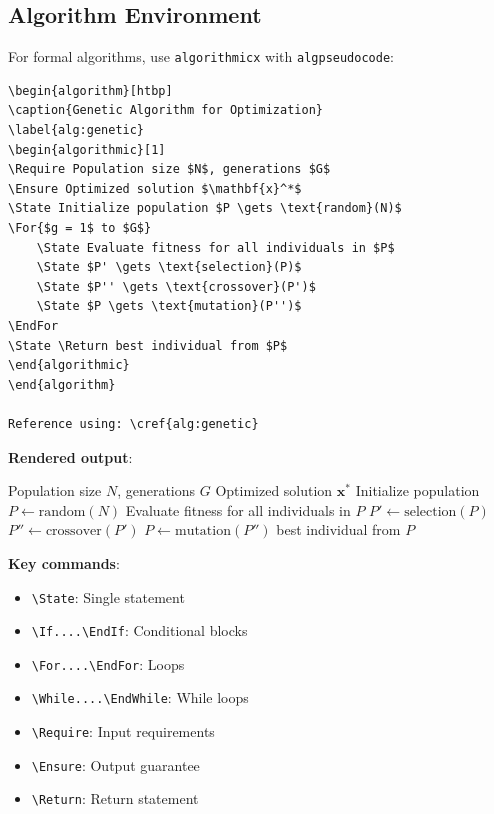 \subsection*{Algorithm Environment}

For formal algorithms, use \texttt{algorithmicx} with \texttt{algpseudocode}:

\begin{verbatim}
\begin{algorithm}[htbp]
\caption{Genetic Algorithm for Optimization}
\label{alg:genetic}
\begin{algorithmic}[1]
\Require Population size $N$, generations $G$
\Ensure Optimized solution $\mathbf{x}^*$
\State Initialize population $P \gets \text{random}(N)$
\For{$g = 1$ to $G$}
    \State Evaluate fitness for all individuals in $P$
    \State $P' \gets \text{selection}(P)$
    \State $P'' \gets \text{crossover}(P')$
    \State $P \gets \text{mutation}(P'')$
\EndFor
\State \Return best individual from $P$
\end{algorithmic}
\end{algorithm}

Reference using: \cref{alg:genetic}
\end{verbatim}

\textbf{Rendered output}:

\begin{algorithm}[htbp]
    \caption{Genetic Algorithm for Optimization}
    \label{alg:genetic_rendered}
    \begin{algorithmic}[1]
        \Require Population size $N$, generations $G$
        \Ensure Optimized solution $\mathbf{x}^*$
        \State Initialize population $P \gets \text{random}(N)$
        \State Evaluate fitness for all individuals in $P$
        \State $P' \gets \text{selection}(P)$
        \State $P'' \gets \text{crossover}(P')$
        \State $P \gets \text{mutation}(P'')$
        \EndFor
        \State \Return best individual from $P$
    \end{algorithmic}
\end{algorithm}

\textbf{Key commands}:
\begin{itemize}
    \item \texttt{\textbackslash State}: Single statement
    \item \texttt{\textbackslash If....\textbackslash EndIf}: Conditional blocks
    \item \texttt{\textbackslash For....\textbackslash EndFor}: Loops
    \item \texttt{\textbackslash While....\textbackslash EndWhile}: While loops
    \item \texttt{\textbackslash Require}: Input requirements
    \item \texttt{\textbackslash Ensure}: Output guarantee
    \item \texttt{\textbackslash Return}: Return statement
\end{itemize}

